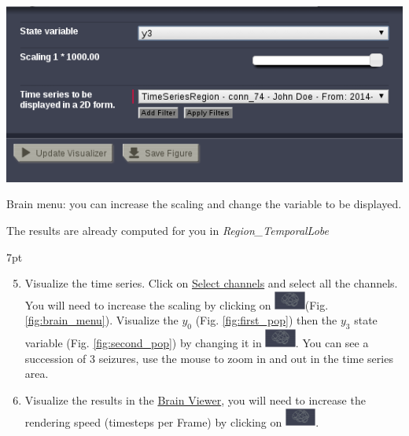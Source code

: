 \documentclass{tufte-handout}
\newenvironment{simulation}{%
  \def\FrameCommand{%
    \hspace{1pt}%
    {\color{ForestGreen}\vrule width 2pt}%
    {\color{simulationshade}\vrule width 4pt}%
    \colorbox{simulationshade}%
  }%
  \MakeFramed{\advance\hsize-\width\FrameRestore}%
  \noindent\hspace{-4.55pt}%
  \begin{adjustwidth}{}{7pt}%
  \vspace{2pt}\vspace{2pt}%
}
{%
  \vspace{2pt}\end{adjustwidth}\endMakeFramed%
}
\begin{document}
\begin{marginfigure}
  \includegraphics[width=\linewidth]{Handout_UI_ModellingAnEpilepticPatient_BrainMenu}%
  \caption{Brain menu: you can increase the scaling and change the variable to be displayed.}%
  \label{fig:brain_menu}%
\end{marginfigure}

The results are already computed for you in \textit{Region\_TemporalLobe}



\begin{simulation}
  \begin{enumerate}
  \setcounter{enumi}{4}
  \item Visualize the time series. Click on \underline{Select channels} and select all the channels. 
	You will need to increase the scaling by clicking on \includegraphics[width=0.08\textwidth]{butt_brain_menu}(Fig. \ref{fig:brain_menu}). Visualize 
	the $y_0$ (Fig. \ref{fig:first_pop}) then the $y_3$ state variable (Fig. \ref{fig:second_pop}) by 
	changing it in \includegraphics[width=0.08\textwidth]{butt_brain_menu}. You can see a succession of 3 seizures, use the mouse
	 to zoom in and out in the time series area.
  \item Visualize the results in the \underline{Brain Viewer}, you will need to increase the rendering speed 
	(timesteps per Frame) by clicking on \includegraphics[width=0.08\textwidth]{butt_brain_menu}.
\end{enumerate}
\end{simulation}
  
\end{document}
